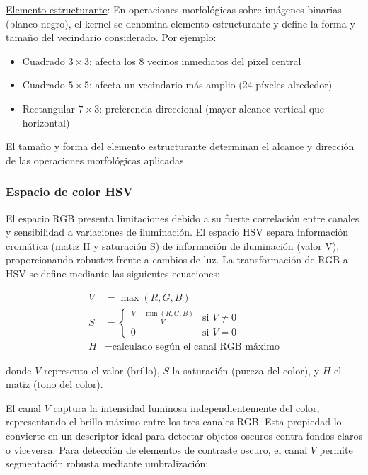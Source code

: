 \underline{Elemento estructurante}: En operaciones morfológicas sobre imágenes binarias (blanco-negro), el kernel se denomina elemento estructurante y define la forma y tamaño del vecindario considerado. Por ejemplo:
\begin{itemize}[label=$\bullet$]
\item Cuadrado $3 \times 3$: afecta los 8 vecinos inmediatos del píxel central
\item Cuadrado $5 \times 5$: afecta un vecindario más amplio (24 píxeles alrededor)
\item Rectangular $7 \times 3$: preferencia direccional (mayor alcance vertical que horizontal)
\end{itemize}

El tamaño y forma del elemento estructurante determinan el alcance y dirección de las operaciones morfológicas aplicadas.

\subsubsection{Espacio de color HSV}

El espacio RGB presenta limitaciones debido a su fuerte correlación entre canales y sensibilidad a variaciones de iluminación. El espacio HSV separa información cromática (matiz H y saturación S) de información de iluminación (valor V), proporcionando robustez frente a cambios de luz. La transformación de RGB a HSV se define mediante las siguientes ecuaciones:

\begin{align}
V &= \max(R, G, B) \\
S &= \begin{cases}
\frac{V - \min(R,G,B)}{V} & \text{si } V \neq 0 \\
0 & \text{si } V = 0
\end{cases} \\
H &= \text{calculado según el canal RGB máximo}
\end{align}

donde $V$ representa el valor (brillo), $S$ la saturación (pureza del color), y $H$ el matiz (tono del color).

El canal $V$ captura la intensidad luminosa independientemente del color, representando el brillo máximo entre los tres canales RGB. Esta propiedad lo convierte en un descriptor ideal para detectar objetos oscuros contra fondos claros o viceversa. Para detección de elementos de contraste oscuro, el canal $V$ permite segmentación robusta mediante umbralización:


